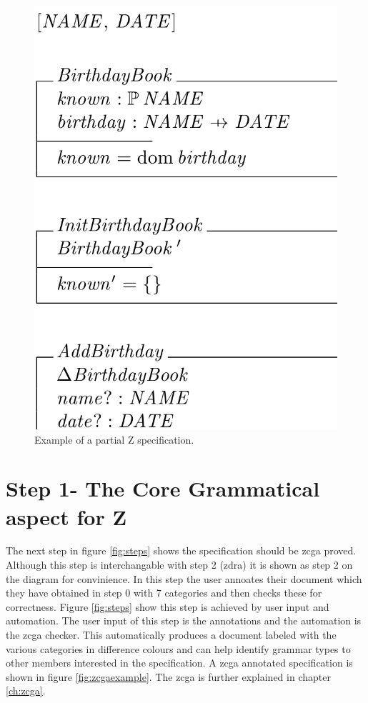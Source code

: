 \begin{figure}[H]
 \begin{center}
 \includegraphics [scale=0.25]{Figures/Design/zspec.png}
 \caption{Example of a partial Z specification.}
 \label{fig:zexample}
\end{center}
\end{figure} 

\section{Step 1- The Core Grammatical aspect for Z}

The next step in figure \ref{fig:steps} shows the specification should be \gls{zcga} proved. Although this step is interchangable with step 2 (\gls{zdra}) it is shown as step 2 on the diagram for convinience. In this step the user annoates their document which they have obtained in step 0 with 7 categories and then checks these for correctness. Figure \ref{fig:steps} show this step is achieved by user input and automation. The user input of this step is the annotations and the automation is the \gls{zcga} checker. This automatically produces a document labeled with the various categories in difference colours and can help identify grammar types to other members interested in the specification. A \gls{zcga} annotated specification is shown in figure \ref{fig:zcgaexample}. The \gls{zcga} is further explained in chapter \ref{ch:zcga}.

